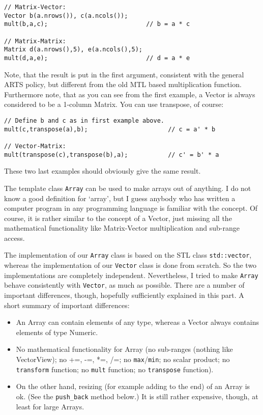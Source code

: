 \begin{verbatim}
// Matrix-Vector:
Vector b(a.nrows()), c(a.ncols());
mult(b,a,c);                           // b = a * c

// Matrix-Matrix:
Matrix d(a.nrows(),5), e(a.ncols(),5);
mult(d,a,e);                           // d = a * e
\end{verbatim}

Note, that the result is put in the first argument, consistent with
the general ARTS policy, but different from the old MTL based
multiplication function. Furthermore note, that as you can see from
the first example, a Vector is always considered to be a 1-column
Matrix. You can use transpose, of course:

\begin{verbatim}
// Define b and c as in first example above.
mult(c,transpose(a),b);                      // c = a' * b

// Vector-Matrix:
mult(transpose(c),transpose(b),a);           // c' = b' * a
\end{verbatim}

These two last examples should obviously give the same result.


\label{sec:matpack:arrays}

The template class \verb|Array| can be used to make arrays out of
anything. I do not know a good definition for `array', but I guess
anybody who has written a computer program in any programming language
is familiar with the concept. Of course, it is rather similar to the
concept of a Vector, just missing all the mathematical functionality
like Matrix-Vector multiplication and sub-range access.

The implementation of our \verb|Array| class is based on the STL class
\verb|std::vector|, whereas the implementation of our \verb|Vector|
class is done from scratch. So the two implementations are completely
independent. Nevertheless, I tried to make \verb|Array| behave
consistently with \verb|Vector|, as much as possible. There are a number
of important differences, though, hopefully sufficiently explained in
this part. A short summary of important differences:

\begin{itemize}
\item An Array can contain elements of any type, whereas a Vector
  always contains elements of type Numeric.
\item No mathematical functionality for Array (no sub-ranges (nothing
  like VectorView); no +=, -=, *=, /=; no \verb|max|/\verb|min|; no
  scalar product; no \verb|transform| function; no \verb|mult|
  function; no \verb|transpose| function).
\item On the other hand, resizing (for example adding to the end) of
  an Array is ok. (See the \verb|push_back| method below.) It is still
  rather expensive, though, at least for large Arrays. 
\end{itemize}

